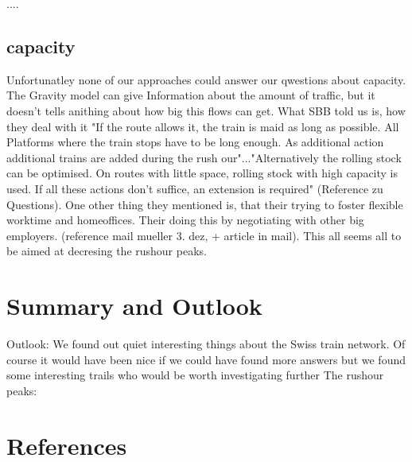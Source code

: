\documentclass[11pt]{article}
\begin{document}
....

\subsection{capacity}

Unfortunatley none of our approaches could answer our qwestions about capacity. The Gravity model can give Information about the amount of traffic, but it doesn't tells anithing about how big this flows can get. What SBB told us is, how they deal with it "If the route allows it, the train is maid as long as possible. All Platforms where the train stops have to be long enough. As additional action additional trains are added during the rush our"..."Alternatively the rolling stock can be optimised. On routes with little space, rolling stock with high capacity is used. If all these actions don't suffice, an extension is required" (Reference zu Questions). One other thing they mentioned is, that their trying to foster flexible worktime and homeoffices. Their doing this by negotiating with other big employers. (reference mail mueller 3. dez, + article in mail). This all seems all to be aimed at decresing the rushour peaks.  




\section{Summary and Outlook}

Outlook:
We found out quiet interesting things about the Swiss train network. Of course it would have been nice if we could have found more answers but we found some interesting trails who would be worth investigating further
The rushour peaks: 


\section{References}


\end{document}
